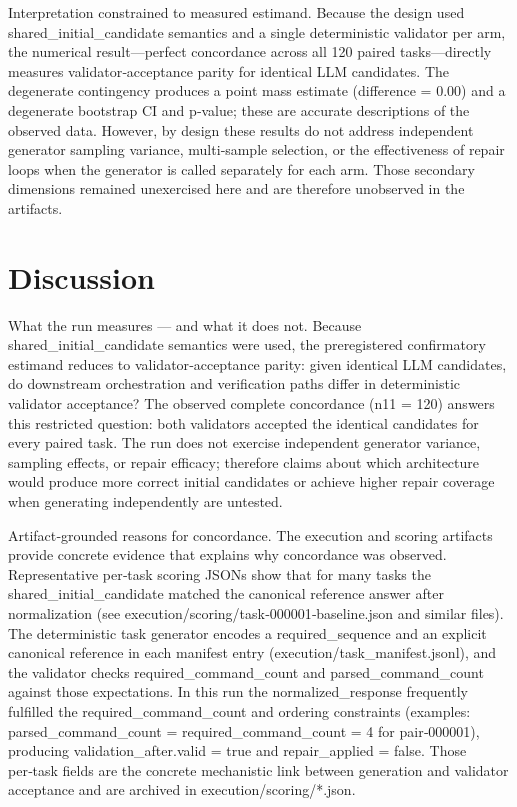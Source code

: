 \documentclass[conference]{IEEEtran}
\begin{document}
Interpretation constrained to measured estimand. Because the design used shared\_initial\_candidate semantics and a single deterministic validator per arm, the numerical result---perfect concordance across all 120 paired tasks---directly measures validator‑acceptance parity for identical LLM candidates. The degenerate contingency produces a point mass estimate (difference = 0.00) and a degenerate bootstrap CI and p‑value; these are accurate descriptions of the observed data. However, by design these results do not address independent generator sampling variance, multi‑sample selection, or the effectiveness of repair loops when the generator is called separately for each arm. Those secondary dimensions remained unexercised here and are therefore unobserved in the artifacts.

\section{Discussion}
What the run measures --- and what it does not. Because shared\_initial\_candidate semantics were used, the preregistered confirmatory estimand reduces to validator‑acceptance parity: given identical LLM candidates, do downstream orchestration and verification paths differ in deterministic validator acceptance? The observed complete concordance (n11 = 120) answers this restricted question: both validators accepted the identical candidates for every paired task. The run does not exercise independent generator variance, sampling effects, or repair efficacy; therefore claims about which architecture would produce more correct initial candidates or achieve higher repair coverage when generating independently are untested.

Artifact‑grounded reasons for concordance. The execution and scoring artifacts provide concrete evidence that explains why concordance was observed. Representative per‑task scoring JSONs show that for many tasks the shared\_initial\_candidate matched the canonical reference answer after normalization (see execution/scoring/task‑000001‑baseline.json and similar files). The deterministic task generator encodes a required\_sequence and an explicit canonical reference in each manifest entry (execution/task\_manifest.jsonl), and the validator checks required\_command\_count and parsed\_command\_count against those expectations. In this run the normalized\_response frequently fulfilled the required\_command\_count and ordering constraints (examples: parsed\_command\_count = required\_command\_count = 4 for pair‑000001), producing validation\_after.valid = true and repair\_applied = false. Those per‑task fields are the concrete mechanistic link between generation and validator acceptance and are archived in execution/scoring/*.json.
\end{document}
